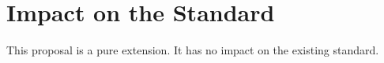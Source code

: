 \section{Impact on the Standard}

This proposal is a pure extension.  It has no impact on the existing standard.

